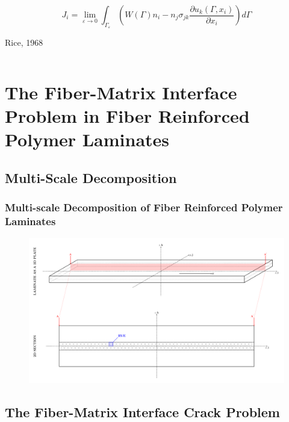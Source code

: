 \documentclass[first,firstsupp,lastsupp,last,hyperref,table]{ETHclass}
\begin{document}
\begin{frame}
\begin{columns}
\begin{column}{0.5\textwidth}
\begin{itemize}[label=]
\begin{equation*}
J_{i}=\lim_{\varepsilon\to 0}\int_{\Gamma_{\varepsilon}}\left(W\left(\Gamma\right)n_{i}-n_{j}\sigma_{jk}\frac{\partial u_{k}\left(\Gamma,x_{i}\right)}{\partial x_{i}}\right)d\Gamma
\end{equation*}

Rice, 1968
\end{itemize}
\end{column}
\end{columns}
\end{frame}

\section[The Fiber-Matrix Interface Problem in FRPC]{The Fiber-Matrix Interface Problem in Fiber Reinforced Polymer Laminates}

\subsection{Multi-Scale Decomposition}

\begin{frame}
\frametitle{\small Multi-scale Decomposition of Fiber Reinforced Polymer Laminates}
\vspace{-1cm}
\centering
\begin{figure}
\centering
\includegraphics[height=0.8\textheight]{laminate-section.pdf}
\label{fig:spread-tow-schematic}
\end{figure}
\end{frame}

\subsection{The Fiber-Matrix Interface Crack Problem}
\end{document}
